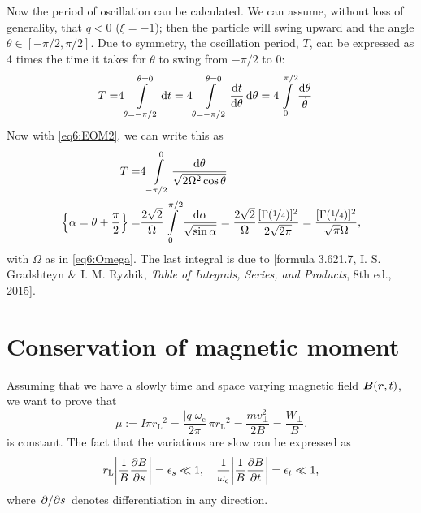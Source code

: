 \documentclass[11pt,a4paper, 
swedish, english %
]{article}
\newcommand{\wc}{\ensuremath{\omega_{\text{c}}}}
\newcommand{\rL}{\ensuremath{r_{\text{L}}}}
\begin{document}
Now the period of oscillation can be calculated. We can assume,
without loss of generality, that $q<0$ ($\xi=-1$); then the particle
will swing upward and the angle $\theta\in[-\pi/2, \pi/2]$. Due to
symmetry, the oscillation period, $T$, can be expressed as 4 times the
time it takes for $\theta$ to swing from $-\pi/2$ to 0:
\begin{equation}
\begin{aligned}
T=&4\int_{\theta=-\pi/2}^{\theta=0}\rd t
=4\int_{\theta=-\pi/2}^{\theta=0}\dv{t}{\theta}\id\theta
=4\int_0^{\pi/2}\frac{\rd\theta}{\dot\theta}
\end{aligned}
\end{equation}
Now with \eqref{eq6:EOM2}, we can write this as
\begin{equation}
\begin{aligned}
T=&4\int_{-\pi/2}^0\frac{\rd\theta}{\sqrt{2\Omega^2\cos\theta}}\\
\qty{\alpha=\theta+\frac{\pi}{2}}
=&\frac{2\sqrt{2}}{\Omega}\int_0^{\pi/2}\frac{\rd\alpha}{\sqrt{\sin\alpha}}
=\frac{2\sqrt{2}}{\Omega}\frac{[\Gamma(\nicefrac14)]^2}{2\sqrt{2\pi}}
=\frac{[\Gamma(\nicefrac14)]^2}{\sqrt{\pi}\Omega},
\end{aligned}
\end{equation}
with $\Omega$ as in \eqref{eq6:Omega}.
The last integral is due to [formula 3.621.7, I. S. Gradshteyn \&
I. M. Ryzhik, \textit{Table of Integrals, Series, and Products}, 8th
ed., 2015].



\section{Conservation of magnetic moment}
Assuming that we have a slowly time and space varying magnetic field
$\vb*B(\vb*r, t)$, we want to prove that
\begin{equation}
\mu:=I\pi\rL^2=\frac{|q|\wc}{2\pi}\,\pi\rL^2=
\frac{mv_\perp^2}{2B}=\frac{W_\perp}{B}.
\end{equation}
is constant. The fact that the
variations are slow can be expressed as
\begin{equation}
\rL\abs{\frac{1}{B}\pdv{B}{s}}=\epsilon_s\ll1
\qc
\frac{1}{\wc}\abs{\frac{1}{B}\pdv{B}{t}}=\epsilon_t\ll1,
\end{equation}
where $\pdv*{s}$ denotes differentiation in any direction.
\end{document}
